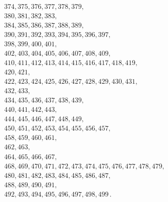 \documentclass{ltxdoc}
\begin{document}
\begin{multline}
374, 375, 376, 377, 378, 379, \\
380, 381, 382, 383, \\
384, 385, 386, 387, 388, 389, \\
390, 391, 392, 393, 394, 395, 396, 397, \\
398, 399, 400, 401, \\
402, 403, 404, 405, 406, 407, 408, 409, \\
410, 411, 412, 413, 414, 415, 416, 417, 418, 419, \\
420, 421, \\
422, 423, 424, 425, 426, 427, 428, 429, 430, 431, \\
432, 433, \\
434, 435, 436, 437, 438, 439, \\
440, 441, 442, 443, \\
444, 445, 446, 447, 448, 449, \\
450, 451, 452, 453, 454, 455, 456, 457, \\
458, 459, 460, 461, \\
462, 463, \\
464, 465, 466, 467, \\
468, 469, 470, 471, 472, 473, 474, 475, 476, 477, 478, 479, \\
480, 481, 482, 483, 484, 485, 486, 487, \\
488, 489, 490, 491, \\
492, 493, 494, 495, 496, 497, 498, 499 \,.
\end{multline}
\nextlipsum

\nolinenumbers
\end{document}
